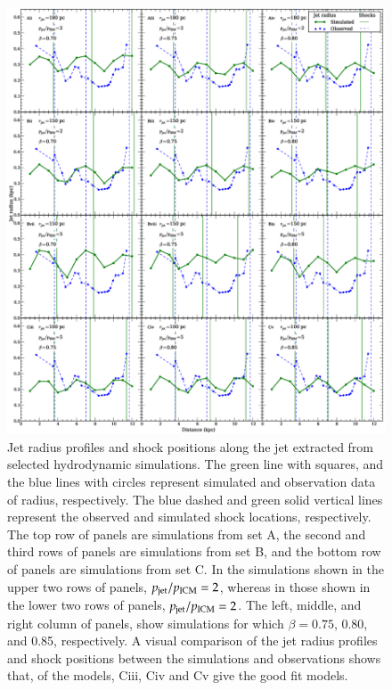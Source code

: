 \begin{figure}
\includegraphics[width=\textwidth]{cmr.eps}
\caption{
Jet radius profiles and shock positions along the jet extracted from selected hydrodynamic simulations. The green line with squares, and the blue lines with circles represent simulated and observation data of radius, respectively. The blue dashed and green solid vertical lines represent the observed and simulated shock locations, respectively. The top row of panels are simulations from set A, the second and third rows of panels are simulations from set B, and the bottom row of panels are simulations from set C. In the simulations shown in the upper two rows of panels, $p_{\rm jet}/p_{\rm ICM}=2$, whereas in those shown in the lower two rows of panels, $p_{\rm jet}/p_{\rm ICM}=2$. The left, middle, and right column of panels, show simulations for which $\beta=0.75$, 0.80, and 0.85, respectively. A visual comparison of the jet radius profiles and shock positions between the simulations and observations shows that, of the models, Ciii, Civ and Cv give the good fit models. }
\label{f:parameter_study}
\end{figure}

